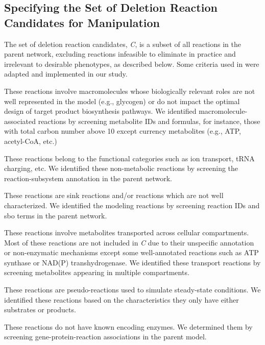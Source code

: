 \subsection{Specifying the Set of Deletion Reaction Candidates for Manipulation} \label{sec:cand}

The set of deletion reaction candidates, \textit{C}, is a subset of all reactions in the parent network, excluding reactions infeasible to eliminate in practice and irrelevant to desirable phenotypes, as described below. Some criteria  used in \cite{Feist2010} were adapted and implemented in our study.

	 These reactions involve macromolecules whose biologically relevant roles are not well represented in the model (e.g., glycogen) or do not impact the optimal design of target product biosynthesis pathways. We identified macromolecule-associated reactions by screening metabolite IDs and formulas, for instance, those with total carbon number above 10 except currency metabolites (e.g., ATP, acetyl-CoA, etc.)

	 These reactions belong to the functional categories such as ion transport, tRNA charging, etc. We identified these non-metabolic reactions by screening the reaction-subsystem annotation in the parent network.

	 These reactions are sink reactions and/or reactions which are not well characterized. We identified the modeling reactions by screening reaction IDs and sbo terms in the parent network.

	 These reactions involve metabolites transported across cellular compartments. Most of these reactions are not included in \textit{C} due to their unspecific annotation or non-enzymatic mechanisms except some well-annotated reactions such as ATP synthase or NAD(P) transhydrogenase. We identified these transport reactions by screening metabolites appearing in multiple compartments.

	 These reactions are pseudo-reactions used to simulate steady-state conditions. We identified these reactions based on the characteristics they only have either substrates or products.

	 These reactions do not have known encoding enzymes. We determined them by screening gene-protein-reaction associations in the parent model.

